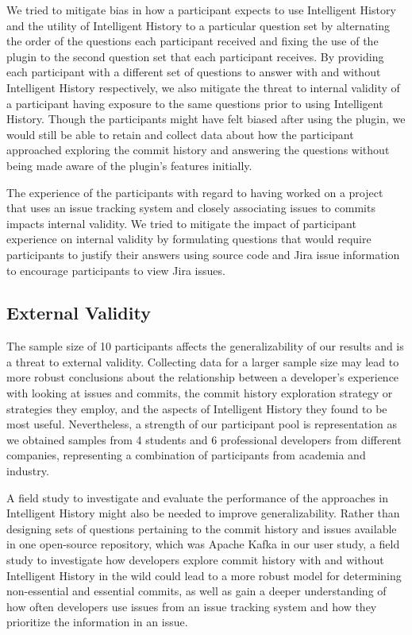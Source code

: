 We tried to mitigate bias in how a participant expects to use Intelligent History and the utility of Intelligent History to a particular question set 
by alternating the order of the questions each participant received and fixing the use of the plugin to the second question set that each participant receives.
By providing each participant with a different set of questions to answer with and without Intelligent History respectively,
we also mitigate the threat to internal validity of a participant having exposure to the same questions prior to using Intelligent History.
Though the participants might have felt biased after using the plugin,
we would still be able to retain and collect data about how the participant approached exploring the commit history and answering the questions without being made aware of the plugin's features initially.

The experience of the participants with regard to having worked on a project that uses an issue tracking system and closely associating issues to commits impacts internal validity.
We tried to mitigate the impact of participant experience on internal validity by formulating questions that would require participants to justify their answers using source code and Jira issue information to
encourage participants to view Jira issues.

\subsection{External Validity}

The sample size of 10 participants affects the generalizability of our results and is a threat to external validity.
Collecting data for a larger sample size may lead to more robust conclusions about the relationship 
between a developer's experience with looking at issues and commits,
the commit history exploration strategy or strategies they employ, 
and the aspects of Intelligent History they found to be most useful.
Nevertheless, a strength of our participant pool is representation as 
we obtained samples from 4 students and 6 professional developers from different companies,
representing a combination of participants from academia and industry.

A field study to investigate and evaluate the performance of the approaches in Intelligent History might also be needed to improve generalizability.
Rather than designing sets of questions pertaining to the commit history and issues available in one open-source repository,
which was Apache Kafka in our user study,
a field study to investigate how developers explore commit history with and without Intelligent History in the wild 
could lead to a more robust model for determining non-essential and essential commits,
as well as gain a deeper understanding of how often developers use issues from an issue tracking system and how they prioritize the information in an issue.

\endinput

Any text after an \endinput is ignored.
You could put scraps here or things in progress.